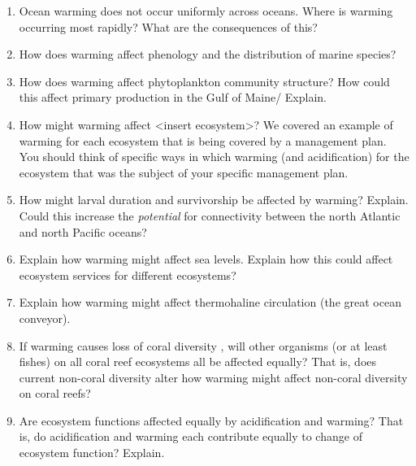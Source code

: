 \documentclass[letterpaper]{tufte-handout}
\begin{document}
\begin{enumerate}

\item\label{uneven_warming} Ocean warming does not occur uniformly across oceans. Where is warming occurring most rapidly? What are the consequences of this?

\item How does warming affect phenology and the distribution of marine species?

\item How does warming affect phytoplankton community structure? How could this affect primary production in the Gulf of Maine/ Explain.

\item How might warming affect <insert ecosystem>? We covered an example of warming for each ecosystem that is being covered by a management plan. You should think of specific ways in which warming (and acidification) for the ecosystem that was the subject of your specific management plan.

\item How might larval duration and survivorship be affected by warming? Explain. Could this increase the \emph{potential} for connectivity between the north Atlantic and north Pacific oceans?

\item Explain how warming might affect sea levels. Explain how this could affect ecosystem services for different ecosystems?

\item Explain how warming might affect thermohaline circulation (the great ocean conveyor).

\item If warming causes loss of coral diversity , will other organisms (or at least fishes) on all coral reef ecosystems all be affected equally? That is, does current non-coral diversity alter how warming might affect non-coral diversity on coral reefs?

\item Are ecosystem functions affected equally by acidification and warming? That is, do acidification and warming each contribute equally to change of ecosystem function? Explain.

\end{enumerate}
\end{document}
